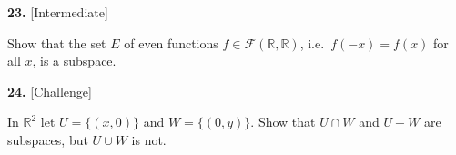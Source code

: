 \documentclass[11pt]{article}
\begin{document}
\begin{minipage}{\linewidth}\textbf{23.} \hfill{\scriptsize\color{ink}[Intermediate]}\par\nopagebreak Show that the set $E$ of even functions $f\in\mathcal F(\mathbb{R},\mathbb{R})$, i.e.\ $f(-x)=f(x)$ for all $x$, is a subspace.
\vspace{4.4cm}\end{minipage}\par\vspace{4pt}
\begin{minipage}{\linewidth}\textbf{24.} \hfill{\scriptsize\color{ink}[Challenge]}\par\nopagebreak In $\mathbb{R}^{2}$ let $U=\{(x,0)\}$ and $W=\{(0,y)\}$. Show that $U\cap W$ and $U+W$ are subspaces, but $U\cup W$ is not.
\vspace{5.0cm}\end{minipage}\par\vspace{4pt}
\end{document}
